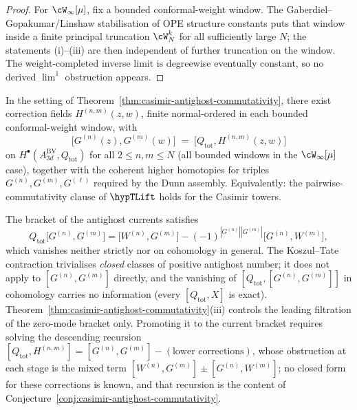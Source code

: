 \begin{proof}
For $\cW_\infty[\mu]$, fix a bounded conformal-weight window. The
Gaberdiel--Gopakumar/Linshaw stabilisation of OPE structure constants
puts that window inside a finite principal truncation
$\cW_N^k$ for all sufficiently large $N$; the statements
\textup{(i)--(iii)} are then independent of further truncation on the
window. The weight-completed inverse limit is degreewise eventually
constant, so no derived $\lim^1$ obstruction appears.
\end{proof}

\begin{conjecture}
\label{conj:casimir-antighost-commutativity}
In the setting of
Theorem~\ref{thm:casimir-antighost-commutativity}, there exist
correction fields $H^{(n,m)}(z,w)$, finite normal-ordered in each
bounded conformal-weight window, with
\begin{equation}\label{eq:casimir-antighost-commute-conj}
\bigl[G^{(n)}(z),G^{(m)}(w)\bigr]
\;=\;
\bigl[Q_{\mathrm{tot}},H^{(n,m)}(z,w)\bigr]
\end{equation}
on $H^\bullet(A^{\mathrm{BV}}_{3d},Q_{\mathrm{tot}})$ for all
$2\le n,m\le N$ (all bounded windows in the $\cW_\infty[\mu]$ case),
together with the coherent higher homotopies for triples
$G^{(n)},G^{(m)},G^{(\ell)}$ required by the Dunn assembly.
Equivalently: the pairwise-commutativity clause of \(\hypTLift\)
holds for the Casimir towers.
\end{conjecture}

\begin{remark}
\label{rem:casimir-commutativity-obstruction}
The bracket of the antighost currents satisfies
\[
Q_{\mathrm{tot}}\bigl[G^{(n)},G^{(m)}\bigr]
=\bigl[W^{(n)},G^{(m)}\bigr]
-(-1)^{|G^{(n)}||G^{(m)}|}\bigl[G^{(n)},W^{(m)}\bigr],
\]
which vanishes neither strictly nor on cohomology in general. The
Koszul--Tate contraction trivialises \emph{closed} classes of
positive antighost number; it does not apply to
$[G^{(n)},G^{(m)}]$ directly, and the vanishing of
$[Q_{\mathrm{tot}},[G^{(n)},G^{(m)}]]$ in cohomology carries no
information (every $[Q_{\mathrm{tot}},X]$ is exact).
Theorem~\ref{thm:casimir-antighost-commutativity}(iii) controls the
leading filtration of the zero-mode bracket only. Promoting it to
the current bracket requires solving the descending recursion
$[Q_{\mathrm{tot}},H^{(n,m)}]=[G^{(n)},G^{(m)}]-(\text{lower
corrections})$, whose obstruction at each stage is the mixed term
$[W^{(n)},G^{(m)}]\pm[G^{(n)},W^{(m)}]$; no closed form for these
corrections is known, and that recursion is the content of
Conjecture~\ref{conj:casimir-antighost-commutativity}.
\end{remark}


